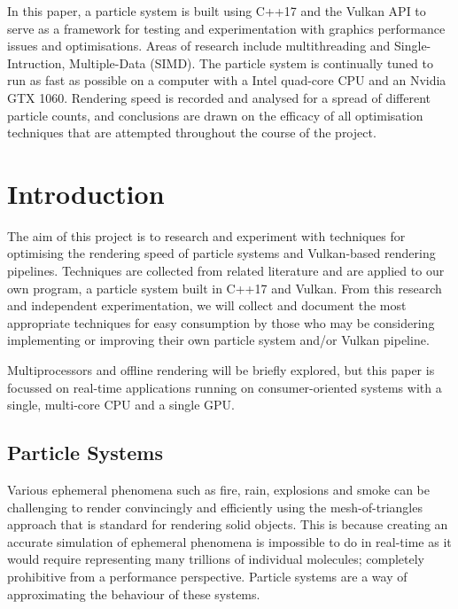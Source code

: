 \documentclass[11pt, a4paper, twocolumn]{article}
\begin{document}
In this paper, a particle system is built using C++17 and the Vulkan API to serve as a framework for testing and experimentation with graphics performance issues and optimisations. Areas of research include multithreading and Single-Intruction, Multiple-Data (SIMD). The particle system is continually tuned to run as fast as possible on a computer with a Intel quad-core CPU and an Nvidia GTX 1060. Rendering speed is recorded and analysed for a spread of different particle counts, and conclusions are drawn on the efficacy of all optimisation techniques that are attempted throughout the course of the project.

\twocolumn

\renewcommand{\cfttoctitlefont}{\sffamily\bfseries\Large}
\renewcommand{\cftsecfont}{\sffamily\bfseries}
\tableofcontents

\renewcommand{\cftloftitlefont}{\sffamily\bfseries\Large}
\listoffigures

\newpage

\section{Introduction}

The aim of this project is to research and experiment with techniques for optimising the rendering speed of particle systems and Vulkan-based rendering pipelines. Techniques are collected from related literature and are applied to our own program, a particle system built in C++17 and Vulkan. From this research and independent experimentation, we will collect and document the most appropriate techniques for easy consumption by those who may be considering implementing or improving their own particle system and/or Vulkan pipeline.

Multiprocessors and offline rendering will be briefly explored, but this paper is focussed on real-time applications running on consumer-oriented systems with a single, multi-core CPU and a single GPU.

\subsection{Particle Systems}

Various ephemeral phenomena such as fire, rain, explosions and smoke can be challenging to render convincingly and efficiently using the mesh-of-triangles approach that is standard for rendering solid objects. This is because creating an accurate simulation of ephemeral phenomena is impossible to do in real-time as it would require representing many trillions of individual molecules; completely prohibitive from a performance perspective. Particle systems are a way of approximating the behaviour of these systems.
\end{document}
